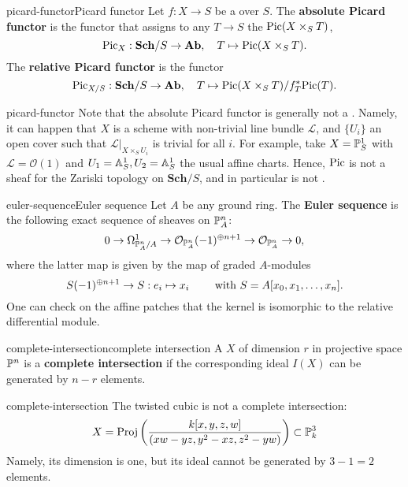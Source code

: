 \begin{topic}{picard-functor}{Picard functor}
    Let $f : X \to S$ be a  over $S$. The \textbf{absolute Picard functor} is the functor that assigns to any $T \to S$ the  $\textup{Pic}(X \times_S T)$,
    \[ \textup{Pic}_X : \textbf{Sch}/S \to \textbf{Ab}, \quad T \mapsto \textup{Pic}(X \times_S T) . \]
    The \textbf{relative Picard functor} is the functor
    \[ \textup{Pic}_{X/S} : \textbf{Sch}/S \to \textbf{Ab}, \quad T \mapsto \textup{Pic}(X \times_S T) / f_T^* \textup{Pic}(T) . \]
\end{topic}

\begin{example}{picard-functor}
    Note that the absolute Picard functor is generally not a . Namely, it can happen that $X$ is a scheme with non-trivial line bundle $\mathcal{L}$, and $\{ U_i \}$ an open cover such that $\mathcal{L}|_{X \times_S U_i}$ is trivial for all $i$. For example, take $X = \PP^1_S$ with $\mathcal{L} = \mathcal{O}(1)$ and $U_1 = \AA^1_S, U_2 = \AA^1_S$ the usual affine charts. Hence, $\textup{Pic}$ is not a sheaf for the Zariski topology on $\textbf{Sch}/S$, and in particular is not .
\end{example}

\begin{topic}{euler-sequence}{Euler sequence}
    Let $A$ be any ground ring. The \textbf{Euler sequence} is the following exact sequence of sheaves on $\PP_A^n$:
    \[ 0 \rightarrow \Omega^1_{\PP^n_A/A} \rightarrow \mathcal{O}_{\PP_A^n}(-1)^{\oplus n + 1} \rightarrow \mathcal{O}_{\PP_A^n} \rightarrow 0 , \]
    where the latter map is given by the map of graded $A$-modules
    \[ S(-1)^{\oplus n + 1} \to S : e_i \mapsto x_i \qquad \textup{ with } S = A[x_0, x_1, \ldots, x_n] . \]
    One can check on the affine patches that the kernel is isomorphic to the relative differential module.
\end{topic}

\begin{topic}{complete-intersection}{complete intersection}
    A  $X$ of dimension $r$ in projective space $\PP^n$ is a \textbf{complete intersection} if the corresponding ideal $I(X)$ can be generated by $n - r$ elements.
\end{topic}

\begin{example}{complete-intersection}
    The twisted cubic is not a complete intersection:
    \[ X = \textup{Proj}\left(\frac{k[x, y, z, w]}{(xw - yz, y^2 - xz, z^2 - yw)}\right) \subset \PP_k^3 \]
    Namely, its dimension is one, but its ideal cannot be generated by $3 - 1 = 2$ elements.
\end{example}

